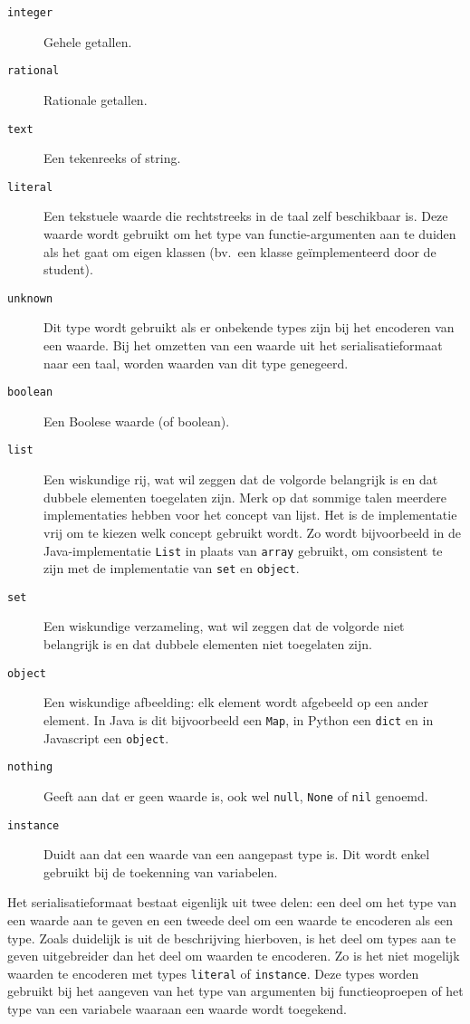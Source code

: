 \begin{description}
    \item[\texttt{integer}] Gehele getallen.
    \item[\texttt{rational}] Rationale getallen.
    \item[\texttt{text}] Een tekenreeks of string.
    \item[\texttt{literal}] Een tekstuele waarde die rechtstreeks in de taal zelf beschikbaar is.
    Deze waarde wordt gebruikt om het type van functie-argumenten aan te duiden als het gaat om eigen klassen (bv.\  een klasse geïmplementeerd door de student).
    \item[\texttt{unknown}] Dit type wordt gebruikt als er onbekende types zijn bij het encoderen van een waarde.
    Bij het omzetten van een waarde uit het serialisatieformaat naar een taal, worden waarden van dit type genegeerd.
    \item[\texttt{boolean}] Een Boolese waarde (of boolean).
    \item[\texttt{list}] Een wiskundige rij, wat wil zeggen dat de volgorde belangrijk is en dat dubbele elementen toegelaten zijn.
    Merk op dat sommige talen meerdere implementaties hebben voor het concept van lijst.
    Het is de implementatie vrij om te kiezen welk concept gebruikt wordt.
    Zo wordt bijvoorbeeld in de Java-implementatie \texttt{List} in plaats van \texttt{array} gebruikt, om consistent te zijn met de implementatie van \texttt{set} en \texttt{object}.
    \item[\texttt{set}] Een wiskundige verzameling, wat wil zeggen dat de volgorde niet belangrijk is en dat dubbele elementen niet toegelaten zijn.
    \item[\texttt{object}] Een wiskundige afbeelding: elk element wordt afgebeeld op een ander element.
    In Java is dit bijvoorbeeld een \texttt{Map}, in Python een \texttt{dict} en in Javascript een \texttt{object}.
    \item[\texttt{nothing}] Geeft aan dat er geen waarde is, ook wel \texttt{null}, \texttt{None} of \texttt{nil} genoemd.
    \item[\texttt{instance}] Duidt aan dat een waarde van een aangepast type is.
    Dit wordt enkel gebruikt bij de toekenning van variabelen.
\end{description}

Het serialisatieformaat bestaat eigenlijk uit twee delen: een deel om het type van een waarde aan te geven en een tweede deel om een waarde te encoderen als een type.
Zoals duidelijk is uit de beschrijving hierboven, is het deel om types aan te geven uitgebreider dan het deel om waarden te encoderen.
Zo is het niet mogelijk waarden te encoderen met types \texttt{literal} of \texttt{instance}.
Deze types worden gebruikt bij het aangeven van het type van argumenten bij functieoproepen of het type van een variabele waaraan een waarde wordt toegekend.


